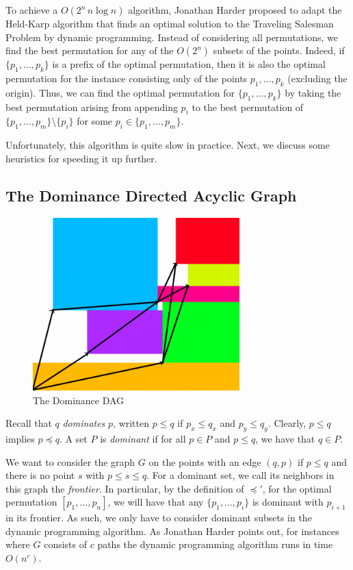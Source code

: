 \documentclass[11pt, a4paper, twocolumn]{article}
\begin{document}
To achieve a $O(2^n\, n\log n)$ algorithm, Jonathan Harder \cite{harder2019anchoredrectanglecover}
proposed to adapt the Held-Karp algorithm that finds an optimal solution to the Traveling Salesman Problem
by dynamic programming. Instead of considering all permutations, we find the best permutation for
any of the $O(2^n)$ subsets of the points. Indeed, if $\{p_1, \dots, p_k\}$ is a prefix of the optimal permutation,
then it is also the optimal permutation for the instance consisting only of the points $p_1, \dots, p_k$ (excluding
the origin). Thus, we can find the optimal permutation for $\{p_1, \dots, p_k\}$ by taking the best
permutation arising from appending $p_i$ to the best permutation of $\{p_1, \dots, p_m\} \setminus \{p_i\}$
for some $p_i \in \{p_1, \dots, p_m\}$.

Unfortunately, this algorithm is quite slow in practice.
Next, we discuss some heuristics for speeding it up further.

\subsection{The Dominance Directed Acyclic Graph}

\begin{figure}
  \begin{center}
  \includegraphics[width=8cm]{dominance-dag.png}
  \end{center}
\caption{The Dominance DAG}
\label{domdag}
\end{figure}

Recall that $q$ \textit{dominates} $p$, written $p \leq q$ if
$p_x \leq q_x$ and $p_y \leq q_y$. Clearly, $p \leq q$ implies $p \preceq q$.
A set $P$ is \textit{dominant} if for all $p \in P$ and $p \leq q$,
we have that $q \in P$.

We want to consider the graph $G$ on the points with an edge $(q, p)$ if $p \leq q$
and there is no point $s$ with $p \leq s \leq q$. For a dominant set, we call its
neighbors in this graph the \textit{frontier}. In particular, by the definition of $\preceq'$,
for the optimal permutation $[p_1, \dots, p_n]$, we will have that
any $\{p_1, \dots, p_i\}$ is dominant with $p_{i+1}$ in its frontier. As such, we
only have to consider dominant subsets in the dynamic programming algorithm.
As Jonathan Harder points out, for instances where $G$ consists of $c$ paths
the dynamic programming algorithm runs in time $O(n^c)$.
\end{document}
